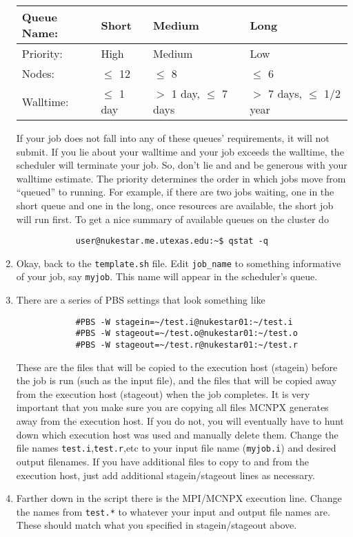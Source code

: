 \documentclass[a4paper, 12pt]{article}
\begin{document}
\begin{enumerate}
		\begin{tabular}{|l|l|l|l|}
			\hline
			Queue Name: & \textbf{Short} & \textbf{Medium} & \textbf{Long} \\
			\hline
			Priority: & High & Medium & Low \\
			Nodes: & \(\leq\) 12& \(\leq\) 8 & \(\leq\) 6 \\
			Walltime: & \(\leq\) 1 day & \(>\) 1 day, \(\leq\) 7 days & \(>\) 7 days, \(\leq\) 1/2 year \\
			\hline
		\end{tabular}

	If your job does not fall into any of these queues' requirements, it will not submit. If you lie about your walltime and your job exceeds the walltime, the scheduler will terminate your job. So, don't lie and and be generous with your walltime estimate. The priority determines the order in which jobs move from ``queued'' to running. For example, if there are two jobs waiting, one in the short queue and one in the long, once resources are available, the short job will run first. To get a nice summary of available queues on the cluster do
		\begin{verbatim}
			user@nukestar.me.utexas.edu:~$ qstat -q
		\end{verbatim}
	\item Okay, back to the \verb+template.sh+ file. Edit \verb+job_name+ to something informative of your job, say \verb+myjob+. This name will appear in the scheduler's queue.
	\item There are a series of PBS settings that look something like
		\begin{verbatim}
			#PBS -W stagein=~/test.i@nukestar01:~/test.i
			#PBS -W stageout=~/test.o@nukestar01:~/test.o
			#PBS -W stageout=~/test.r@nukestar01:~/test.r
		\end{verbatim}
		These are the files that will be copied to the execution host (stagein) before the job is run (such as the input file), and the files that will be copied away from the execution host (stageout) when the job completes. It is very important that you make sure you are copying all files MCNPX generates away from the execution host. If you do not, you will eventually have to hunt down which execution host was used and manually delete them. Change the file names \verb+test.i+,\verb+test.r+,etc to your input file name (\verb+myjob.i+) and desired output filenames. If you have additional files to copy to and from the execution host, just add additional stagein/stageout lines as necessary.
	\item Farther down in the script there is the MPI/MCNPX execution line. Change the names from \verb+test.*+ to whatever your input and output file names are. These should match what you specified in stagein/stageout above.

\end{enumerate}
\end{document}
